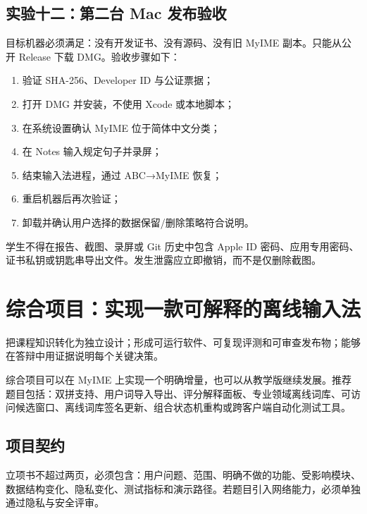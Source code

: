\section{实验十二：第二台 Mac 发布验收}

目标机器必须满足：没有开发证书、没有源码、没有旧 MyIME 副本。只能从公开 Release 下载 DMG。验收步骤如下：

\begin{enumerate}
  \item 验证 SHA-256、Developer ID 与公证票据；
  \item 打开 DMG 并安装，不使用 Xcode 或本地脚本；
  \item 在系统设置确认 MyIME 位于简体中文分类；
  \item 在 Notes 输入规定句子并录屏；
  \item 结束输入法进程，通过 ABC→MyIME 恢复；
  \item 重启机器后再次验证；
  \item 卸载并确认用户选择的数据保留/删除策略符合说明。
\end{enumerate}

\begin{warningbox}[凭据纪律]
学生不得在报告、截图、录屏或 Git 历史中包含 Apple ID 密码、应用专用密码、证书私钥或钥匙串导出文件。发生泄露应立即撤销，而不是仅删除截图。
\end{warningbox}


\chapter{综合项目：实现一款可解释的离线输入法}

\begin{goals}
把课程知识转化为独立设计；形成可运行软件、可复现评测和可审查发布物；能够在答辩中用证据说明每个关键决策。
\end{goals}

综合项目可以在 MyIME 上实现一个明确增量，也可以从教学版继续发展。推荐题目包括：双拼支持、用户词导入导出、评分解释面板、专业领域离线词库、可访问候选窗口、离线词库签名更新、组合状态机重构或跨客户端自动化测试工具。

\section{项目契约}

立项书不超过两页，必须包含：用户问题、范围、明确不做的功能、受影响模块、数据结构变化、隐私变化、测试指标和演示路径。若题目引入网络能力，必须单独通过隐私与安全评审。

